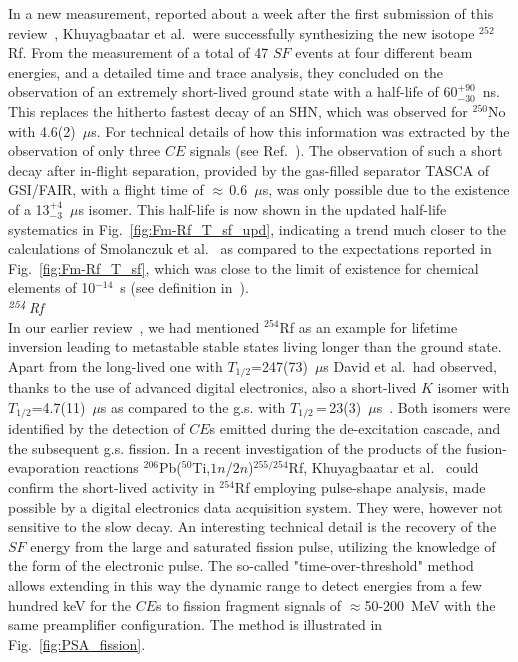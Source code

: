 In a new measurement, reported about a week after the first submission of this review~\cite{Khuyagbaatar2025}, Khuyagbaatar et al.~were successfully synthesizing the new isotope $^{252}$Rf. 
From the measurement of a total of 47 $SF$ events at four different beam energies, and a detailed time and trace analysis, they concluded on the observation of an extremely short-lived ground state with a half-life of 60$^{+90}_{-30}$~ns.
This replaces the hitherto fastest decay of an SHN, which was observed for $^{250}$No with 4.6(2)~$\mu$s.
For technical details of how this information was extracted by the observation of only three $CE$ signals (see Ref.~\cite{Khuyagbaatar2025}).
The observation of such a short decay after in-flight separation, provided by the gas-filled separator TASCA of GSI/FAIR, with a flight time of $\approx$\,0.6~$\mu$s, was only possible due to the existence of a 13$^{+4}_{-3}$~$\mu$s isomer.
This half-life is now shown in the updated half-life systematics in Fig.~\ref{fig:Fm-Rf_T_sf_upd}, indicating a trend much closer to the calculations of Smolanczuk et al.~\cite{Smolanczuk1995} as compared to the expectations reported in Fig.~\ref{fig:Fm-Rf_T_sf}, which was close to the limit of existence for chemical elements of 10$^{-14}$~s (see definition in~\cite{Khuyagbaatar2025}).\\

{\it $^{\it254}$Rf}\\ 
In our earlier review~\cite{Ackermann2017}, we had mentioned $^{254}$Rf as an example for lifetime inversion leading to metastable stable states living longer than the ground state. 
Apart from the long-lived one with $T_{1/2}$=247(73)~$\mu$s David et al.~had observed, thanks to the use of advanced digital electronics, also a short-lived $K$ isomer with $T_{1/2}$=4.7(11)~$\mu$s as compared to the g.s. with $T_{1/2}$\,=\,23(3)~$\mu$s~\cite{David2015}.  
Both isomers were identified by the detection of $CE$s emitted during the de-excitation cascade, and the subsequent g.s. fission. 
In a recent investigation of the products of the fusion-evaporation reactions $^{206}$Pb($^{50}$Ti,$1n$/$2n$)$^{255/254}$Rf, Khuyagbaatar et al.~\cite{Khuyagbaatar2020b} could confirm the short-lived activity in $^{254}$Rf employing pulse-shape analysis, made possible by a digital electronics data acquisition system. 
They were, however not sensitive to the slow decay. 
An interesting technical detail is the recovery of the $SF$ energy from the large and saturated fission pulse, utilizing the knowledge of the form of the electronic pulse. 
The so-called "time-over-threshold" method allows extending in this way the dynamic range to detect energies from a few hundred keV for the $CE$s to fission fragment signals of $\approx$50-200~MeV with the same preamplifier configuration. 
The method is illustrated in Fig.~\ref{fig:PSA_fission}.

